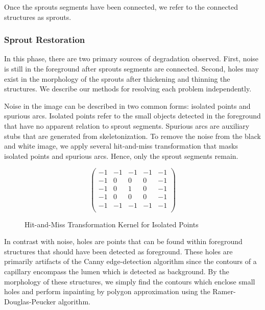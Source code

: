 \documentclass{sig-alternate}
\begin{document}
			Once the sprouts segments have been connected, we refer to the
			connected structures as sprouts.

		\subsubsection{Sprout Restoration} %
		\label{sub:Sprout Restoration}
			In this phase, there are two primary sources of degradation
			observed. First, noise is still in the foreground after
			sprouts segments are connected. Second, holes may exist in
			the morphology of the sprouts after thickening and thinning
			the structures. We describe our methods for resolving each
			problem independently.

			Noise in the image can be described in two common forms:
			isolated points and spurious arcs. Isolated points refer to
			the small objects detected in the foreground that have no
			apparent relation to sprout segments. Spurious arcs are
			auxiliary stubs that are generated from skeletonization. To
			remove the noise from the black and white image, we apply
			several hit-and-miss transformation that masks isolated points
			and spurious arcs. Hence, only the sprout segments remain.
			\begin{figure}[htp]
				\[
					\left(\begin{matrix}
						-1 & -1 & -1 & -1 & -1 \\
						-1 & 0 & 0 & 0 & -1 \\
						-1 & 0 & 1 & 0 & -1 \\
						-1 & 0 & 0 & 0 & -1 \\
						-1 & -1 & -1 & -1 & -1 \\
					\end{matrix} \right)
				\]
				\caption{Hit-and-Miss Transformation Kernel for Isolated Points}
			\end{figure}

			In contrast with noise, holes are points that can be found
			within foreground structures that should have been detected as
			foreground. These holes are primarily artifacts of the Canny
			edge-detection algorithm since the contours of a capillary
			encompass the lumen which is detected as background. By the
			morphology of these structures, we simply find the contours
			which enclose small holes and perform inpainting by polygon
			approximation using the Ramer-Douglas-Peucker algorithm.
\end{document}
